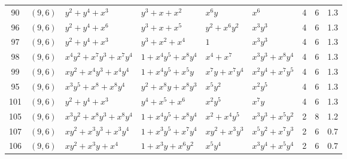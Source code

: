 \begin{table}[t]
\begin{tabular*}{\textwidth}{@{\extracolsep{\fill}}cllllllcc}
90 & $(9,6)$ & $y^{2}{+}y^{4}{+}x^{3}$ & $y^{3}{+}x{+}x^{2}$ & $x^{6}y$ & $x^{6}$ & 4 & 6 & 1.3 \\
96 & $(9,6)$ & $y^{2}{+}y^{4}{+}x^{6}$ & $y^{3}{+}x{+}x^{5}$ & $y^{2}{+}x^{6}y^{2}$ & $x^{3}y^{3}$ & 4 & 6 & 1.3 \\
97 & $(9,6)$ & $y^{2}{+}y^{4}{+}x^{3}$ & $y^{3}{+}x^{2}{+}x^{4}$ & $1$ & $x^{3}y^{3}$ & 4 & 6 & 1.3 \\
98 & $(9,6)$ & $x^{4}y^{2}{+}x^{7}y^{3}{+}x^{7}y^{4}$ & $1{+}x^{4}y^{5}{+}x^{8}y^{4}$ & $x^{4}{+}x^{7}$ & $x^{3}y^{3}{+}x^{8}y^{4}$ & 4 & 6 & 1.3 \\
99 & $(9,6)$ & $xy^{2}{+}x^{4}y^{3}{+}x^{4}y^{4}$ & $1{+}x^{4}y^{5}{+}x^{5}y$ & $x^{7}y{+}x^{7}y^{4}$ & $x^{2}y^{4}{+}x^{7}y^{5}$ & 4 & 6 & 1.3 \\
95 & $(9,6)$ & $x^{3}y^{5}{+}x^{8}{+}x^{8}y^{4}$ & $y^{2}{+}x^{8}y{+}x^{8}y^{3}$ & $x^{5}y^{2}$ & $x^{2}y^{5}$ & 4 & 6 & 1.3 \\
101 & $(9,6)$ & $y^{2}{+}y^{4}{+}x^{3}$ & $y^{4}{+}x^{5}{+}x^{6}$ & $x^{2}y^{5}$ & $x^{7}y$ & 4 & 6 & 1.3 \\
105 & $(9,6)$ & $x^{3}y^{2}{+}x^{8}y^{3}{+}x^{8}y^{4}$ & $1{+}x^{4}y^{5}{+}x^{8}y^{4}$ & $x^{2}{+}x^{4}y^{5}$ & $x^{3}y^{3}{+}x^{5}y^{2}$ & 2 & 8 & 1.2 \\
107 & $(9,6)$ & $xy^{2}{+}x^{3}y^{3}{+}x^{3}y^{4}$ & $1{+}x^{3}y^{5}{+}x^{7}y^{4}$ & $xy^{2}{+}x^{3}y^{3}$ & $x^{5}y^{2}{+}x^{7}y^{3}$ & 2 & 6 & 0.7 \\
106 & $(9,6)$ & $xy^{2}{+}x^{3}y{+}x^{4}$ & $1{+}x^{3}y{+}x^{6}y^{2}$ & $x^{5}y^{4}$ & $x^{3}y^{4}{+}x^{5}y^{4}$ & 2 & 6 & 0.7 \\
\bottomrule
\end{tabular*}
\end{table}

